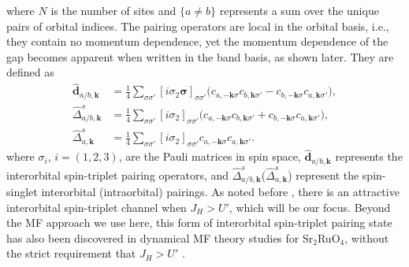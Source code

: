 \documentclass[%
reprint,
superscriptaddress,
 amsmath,amssymb,
 aps,
prb,
nobalancelastpage,
]{revtex4-2}
\begin{document}
where $N$ is the number of sites and $\{a\neq b\}$ represents a sum over the unique pairs of orbital indices. The pairing operators are local in the orbital basis, i.e., they contain no momentum dependence, yet the momentum dependence of the gap becomes apparent when written in the band basis, as shown later. They are defined as
\begin{equation} \label{OPs}
\begin{aligned}
\hat{\textbf{d}}_{a/b,\textbf{k}} &= \frac{1}{4}\sum_{\sigma\sigma'}[i\sigma_{2}\boldsymbol{\sigma}]_{\sigma\sigma'}\bigl(c_{a,-\textbf{k}\sigma}c_{b,\textbf{k}\sigma'} - c_{b,-\textbf{k}\sigma}c_{a,\textbf{k}\sigma'}\bigr), \\
\hat{\Delta}^{s}_{a/b,\textbf{k}} &= \frac{1}{4}\sum_{\sigma\sigma'}[i\sigma_{2}]_{\sigma\sigma'}\bigl(c_{a,-\textbf{k}\sigma}c_{b,\textbf{k}\sigma'} + c_{b,-\textbf{k}\sigma}c_{a,\textbf{k}\sigma'}\bigr), \\ \hat{\Delta}^{s}_{a,\textbf{k}} &= \frac{1}{4}\sum_{\sigma\sigma'}[i\sigma_{2}]_{\sigma\sigma'}c_{a,-\textbf{k}\sigma}c_{a,\textbf{k}\sigma'}.
\end{aligned}
\end{equation}
where $\sigma_{i}$, $i=(1,2,3)$, are the Pauli matrices in spin space, $\hat{\textbf{d}}_{a/b,\textbf{k}}$ represents the interorbital spin-triplet pairing operators, and $\hat{\Delta}^{s}_{a/b,\textbf{k}}$($\hat{\Delta}^{s}_{a,\textbf{k}}$) represent the spin-singlet interorbital (intraorbital) pairings. As noted before \cite{klejnberg1999hund,SpalekPRB2001,HanPRB2004,Puetter2012EPL,vafek2017hund}, there is an attractive interorbital spin-triplet channel when $J_{H} > U'$, which will be our focus. Beyond the MF approach we use here, this form of interorbital spin-triplet pairing state has also been discovered in dynamical MF theory studies for Sr$_{2}$RuO$_{4}$, without the strict requirement that $J_{H} > U'$  \cite{Hoshino2015PRL,Hoshino2016PRB, Gingras2019PRL}.
\end{document}
